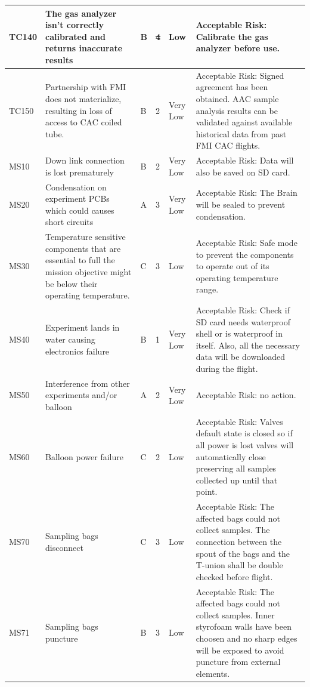 \documentclass[a4paper,12pt,twoside]{article}
\providecommand{\DIFaddtex}[1]{{\protect\color{blue}\uwave{#1}}} %
\providecommand{\DIFdeltex}[1]{{\protect\color{red}\sout{#1}}}                      %
\providecommand{\DIFaddbegin}{} %
\providecommand{\DIFaddend}{} %
\providecommand{\DIFdelbegin}{} %
\providecommand{\DIFdelend}{} %
\providecommand{\DIFadd}[1]{\texorpdfstring{\DIFaddtex{#1}}{#1}} %
\providecommand{\DIFdel}[1]{\texorpdfstring{\DIFdeltex{#1}}{}} %
\newcommand{\DIFscaledelfig}{0.5}
\newlength{\DIFdelgraphicswidth} %
\newlength{\DIFdelgraphicsheight} %
\newcommand{\DIFaddincludegraphics}[2][]{{\color{blue}\fbox{\DIFOincludegraphics[#1]{#2}}}} %
\newcommand{\DIFdelincludegraphics}[2][]{%
\sbox{\DIFdelgraphicsbox}{\DIFOincludegraphics[#1]{#2}}%
\settoboxwidth{\DIFdelgraphicswidth}{\DIFdelgraphicsbox} %
\settoboxtotalheight{\DIFdelgraphicsheight}{\DIFdelgraphicsbox} %
\scalebox{\DIFscaledelfig}{%
\parbox[b]{\DIFdelgraphicswidth}{\usebox{\DIFdelgraphicsbox}\\[-\baselineskip] \rule{\DIFdelgraphicswidth}{0em}}\llap{\resizebox{\DIFdelgraphicswidth}{\DIFdelgraphicsheight}{%
\setlength{\unitlength}{\DIFdelgraphicswidth}%
\begin{picture}(1,1)%
\thicklines\linethickness{2pt} %
{\color[rgb]{1,0,0}\put(0,0){\framebox(1,1){}}}%
{\color[rgb]{1,0,0}\put(0,0){\line( 1,1){1}}}%
{\color[rgb]{1,0,0}\put(0,1){\line(1,-1){1}}}%
\end{picture}%
}\hspace*{3pt}}} %
} %
\DeclareRobustCommand{\DIFaddbegin}{\DIFOaddbegin \let\includegraphics\DIFaddincludegraphics} %
\DeclareRobustCommand{\DIFaddend}{\DIFOaddend \let\includegraphics\DIFOincludegraphics} %
\DeclareRobustCommand{\DIFdelbegin}{\DIFOdelbegin \let\includegraphics\DIFdelincludegraphics} %
\DeclareRobustCommand{\DIFdelend}{\DIFOaddend \let\includegraphics\DIFOincludegraphics} %
\begin{document}
\begin{landscape}
\begin{longtable}{|m{}| m{} |m{} |m{}|m{}| m{}|}
TC140 & The gas analyzer isn't correctly calibrated and returns inaccurate results & B & \DIFdelbegin \DIFdel{4 }\DIFdelend \DIFaddbegin \DIFadd{3 }\DIFaddend & \cellcolor[HTML]{FCFF2F}Low & Acceptable Risk: Calibrate the gas analyzer before use.\\ \hline 
TC150 & Partnership with FMI does not materialize, resulting in loss of access to CAC coiled tube. & B & 2 & \cellcolor[HTML]{34FF34}Very Low & Acceptable Risk: Signed agreement has been obtained. AAC sample analysis results can be validated against available historical data from past FMI CAC flights. \\ \hline 
MS10 & Down link connection is lost prematurely & B & 2 & \cellcolor[HTML]{34FF34}Very Low & Acceptable Risk: Data will also be saved on SD card. \\ \hline
MS20 & Condensation on experiment PCBs which could causes short circuits & A & 3 & \cellcolor[HTML]{34FF34}Very Low & Acceptable Risk: The Brain will be sealed to prevent condensation. \\ \hline
MS30 & Temperature sensitive components that are essential to full the mission objective might be below their operating temperature. & C & 3 & \cellcolor[HTML]{FCFF2F}Low & Acceptable Risk: Safe mode to prevent the components to operate out of its operating temperature range. \\ \hline
MS40 & Experiment lands in water causing electronics failure & B & 1 & \cellcolor[HTML]{34FF34}Very Low & Acceptable Risk: Check if SD card needs waterproof shell or is waterproof in itself. Also, all the necessary data will be downloaded during the flight. \\ \hline
MS50 & Interference from other experiments and/or balloon & A & 2 & \cellcolor[HTML]{34FF34}Very Low & Acceptable Risk: no action. \\ \hline
MS60 & Balloon power failure & C & 2 & \cellcolor[HTML]{FCFF2F}Low & Acceptable Risk: Valves default state is closed so if all power is lost valves will automatically close preserving all samples collected up until that point. \\ \hline
MS70 & Sampling bags disconnect & C & 3 & \cellcolor[HTML]{FCFF2F}Low & Acceptable Risk: The affected bags could not collect samples. The connection between the spout of the bags and the T-union shall be double checked before flight. \\ \hline
MS71 & Sampling bags puncture & B & 3 & \cellcolor[HTML]{FCFF2F}Low & Acceptable Risk: The affected bags could not collect samples. Inner styrofoam walls have been choosen and no sharp edges will be exposed to avoid puncture from external elements. \\ \hline

\end{longtable}
\end{landscape}
\end{document}
